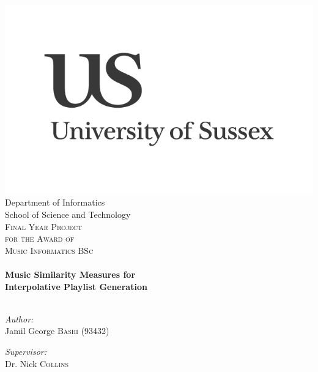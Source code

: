\begin{titlepage}
\begin{center}
\includegraphics[width=0.5\linewidth]{01-Front.chapter/us-logo}\\
\small Department of Informatics\\
School of Science and Technology\\[2cm]

\textsc{\Large Final Year Project\\[0.1cm]
\small for the Award of\\[0.2cm]
\Large Music Informatics BSc}\\[1cm]

\hrulefill \\[0.8cm]
{ \huge \bfseries Music Similarity Measures for\\
Interpolative Playlist Generation}\\[0.8cm]

\hrulefill \\[2.5cm]
\begin{minipage}{0.45\textwidth}
\begin{flushleft} \large
\emph{Author:}\\
Jamil George \textsc{Bashi} (93432)
\end{flushleft}
\end{minipage}
\begin{minipage}{0.45\textwidth}
\begin{flushright} \large
\emph{Supervisor:} \\
Dr. Nick \textsc{Collins}
\end{flushright}
\end{minipage}
\vspace{25cm}

\end{center}
\end{titlepage}